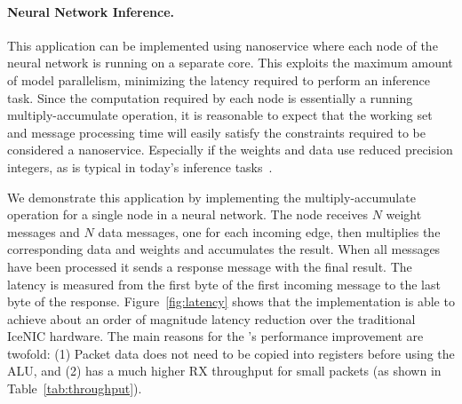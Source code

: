 

\paragraph{Neural Network Inference.} This application can be implemented using nanoservice where each node of the neural network is running on a separate \name{} core.
This exploits the maximum amount of model parallelism,  minimizing the latency required to perform an inference task.
Since the computation required by each node is essentially a running multiply-accumulate operation, it is reasonable to expect that the working set and message processing time will easily satisfy the constraints required to be considered a nanoservice.
Especially if the weights and data use reduced precision integers, as is typical in today's inference tasks~\cite{nn-quantization}.

We demonstrate this application by implementing the multiply-accumulate operation for a single node in a neural network.
The node receives $N$ weight messages and $N$ data messages, one for each incoming edge, then multiplies the corresponding data and weights and accumulates the result.
When all messages have been processed it sends a response message with the final result.
The latency is measured from the first byte of the first incoming message to the last byte of the response.
Figure~\ref{fig:latency} shows that the \name{} implementation is able to achieve about an order of magnitude latency reduction over the traditional IceNIC hardware.
The main reasons for the \name{}'s performance improvement are twofold: (1) Packet data does not need to be copied into registers before using the ALU, and (2) \name{} has a much higher RX throughput for small packets (as shown in Table~\ref{tab:throughput}).

